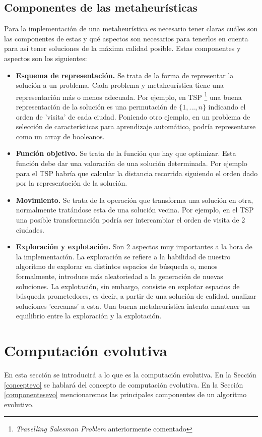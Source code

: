 \subsection{Componentes de las metaheurísticas} \label{componentesmeta}
Para la implementación de una metaheurística es necesario tener claras cuáles son las componentes de estas y qué aspectos son necesarios para tenerlos en cuenta para así tener soluciones de la máxima calidad posible. Estas componentes y aspectos son los siguientes:
\begin{itemize}
	\item \textbf{Esquema de representación. }Se trata de la forma de representar la solución a un problema. Cada problema y metaheurística tiene una representación más o menos adecuada. Por ejemplo, en TSP \footnote{\textit{Travelling Salesman Problem} anteriormente comentado} una buena representación de la solución es una permutación de  $ \{1,...,n\} $ indicando el orden de 'visita' de cada ciudad. Poniendo otro ejemplo, en un problema de selección de características para aprendizaje automático, podría representarse como un array de booleanos.
	\item \textbf{Función objetivo. }Se trata de la función que hay que optimizar. Esta función debe dar una valoración de una solución determinada. Por ejemplo para el TSP habría que calcular la distancia recorrida siguiendo el orden dado por la representación de la solución.
	\item \textbf{Movimiento. }Se trata de la operación que transforma una solución en otra, normalmente tratándose esta de una solución vecina. Por ejemplo, en el TSP una posible transformación podría ser intercambiar el orden de visita de 2 ciudades.
	\item \textbf{Exploración y explotación. }Son 2 aspectos muy importantes a la hora de la implementación. La exploración se refiere a la habilidad de nuestro algoritmo de explorar en distintos espacios de búsqueda o, menos formalmente, introduce más aleatoriedad a la generación de nuevas soluciones. La explotación, sin embargo, consiste en explotar espacios de búsqueda prometedores, es decir, a partir de una solución de calidad, analizar soluciones 'cercanas' a esta. Una buena metaheurística intenta mantener un equilibrio entre la exploración y la explotación.
\end{itemize}

\section{Computación evolutiva} \label{evolution}
En esta sección se introducirá a lo que es la computación evolutiva. En la Sección \ref{conceptevo} se hablará del concepto de computación evolutiva. En la Sección \ref{componentesevo} mencionaremos las principales componentes de un algoritmo evolutivo.

